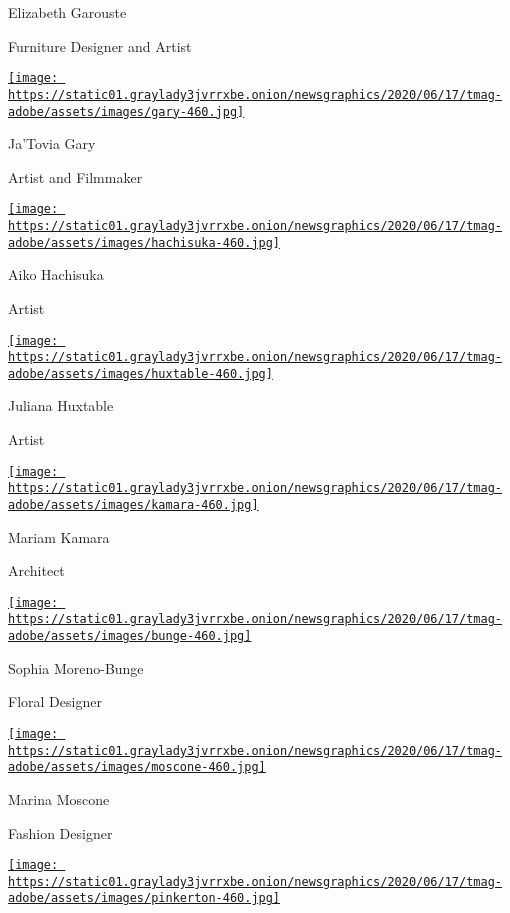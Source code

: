 Elizabeth Garouste

Furniture Designer and Artist

\href{https://www.nytimes3xbfgragh.onion/2020/08/10/t-magazine/jatovia-gary-film.html}{\texttt{[image: https://static01.graylady3jvrrxbe.onion/newsgraphics/2020/06/17/tmag-adobe/assets/images/gary-460.jpg]}}

Ja'Tovia Gary

Artist and Filmmaker

\href{https://www.nytimes3xbfgragh.onion/2020/08/10/t-magazine/aiko-hachisuka-art-sculpture.html}{\texttt{[image: https://static01.graylady3jvrrxbe.onion/newsgraphics/2020/06/17/tmag-adobe/assets/images/hachisuka-460.jpg]}}

Aiko Hachisuka

Artist

\href{https://www.nytimes3xbfgragh.onion/2020/08/10/t-magazine/juliana-huxtable.html}{\texttt{[image: https://static01.graylady3jvrrxbe.onion/newsgraphics/2020/06/17/tmag-adobe/assets/images/huxtable-460.jpg]}}

Juliana Huxtable

Artist

\href{https://www.nytimes3xbfgragh.onion/2020/08/10/t-magazine/mariam-kamara-architect-design.html}{\texttt{[image: https://static01.graylady3jvrrxbe.onion/newsgraphics/2020/06/17/tmag-adobe/assets/images/kamara-460.jpg]}}

Mariam Kamara

Architect

\href{https://www.nytimes3xbfgragh.onion/2020/08/10/t-magazine/sophia-moreno-bunge-floral-design.html}{\texttt{[image: https://static01.graylady3jvrrxbe.onion/newsgraphics/2020/06/17/tmag-adobe/assets/images/bunge-460.jpg]}}

Sophia Moreno-Bunge

Floral Designer

\href{https://www.nytimes3xbfgragh.onion/2020/08/10/t-magazine/marina-moscone-fashion-design.html}{\texttt{[image: https://static01.graylady3jvrrxbe.onion/newsgraphics/2020/06/17/tmag-adobe/assets/images/moscone-460.jpg]}}

Marina Moscone

Fashion Designer

\href{https://www.nytimes3xbfgragh.onion/2020/08/10/t-magazine/amber-pinkerton-photography.html}{\texttt{[image: https://static01.graylady3jvrrxbe.onion/newsgraphics/2020/06/17/tmag-adobe/assets/images/pinkerton-460.jpg]}}

